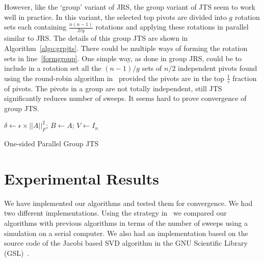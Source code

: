 \documentclass[10pt, conference, compsocconf]{IEEEtran}
\begin{document}
However, like the `group' variant of JRS, the group variant of JTS seem to work well in practice. In this variant, the selected top pivots are divided into $g$ rotation sets each containing $\frac{n(n-1)}{2\tau g}$ rotations and applying these rotations in parallel similar to JRS. The details of this group JTS are shown in Algorithm~\ref{algo:grpjts}. There could be multiple ways of forming the rotation sets in line~\ref{formgroup}. One simple way, as done in group JRS, could be to include in a rotation set all the $(n-1)/g$ sets of $n/2$ independent pivots found using the round-robin algorithm in~\cite{golub2012matrix} provided the pivots are in the top $\frac{1}{\tau}$ fraction of pivots. The pivots in a group are not totally independent, still JTS significantly reduces number of sweeps. It seems hard to prove convergence of group JTS. 


\begin{algorithm}[t]
$\delta \gets \epsilon \times ||A||^2_F$; \quad $B \gets A$; \quad $V \gets I_n$\;
\caption{One-sided Parallel Group JTS}
\label{algo:grpjts}
\end{algorithm}



\section{Experimental Results}
\label{sec:results}

We have implemented our algorithms and tested them for convergence. We had two different implementations. Using the strategy in~\cite{rajasekaran2008relaxation} we compared our algorithms with previous algorithms in terms of the number of sweeps using a simulation on a serial computer. We also had an implementation based on the source code of the Jacobi based SVD algorithm in the GNU Scientific Library (GSL)~\cite{galassi1996gnu}.
\end{document}
